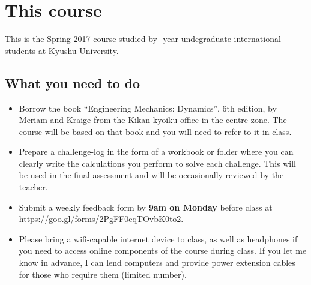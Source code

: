 \section{This course}
This is the Spring 2017 \course course studied by \nensei-year undegraduate international students at Kyushu University.

\subsection{What you need to do}
\begin{itemize}
    \item Borrow the book ``Engineering Mechanics: Dynamics'', 6th edition, by Meriam and Kraige from the Kikan-kyoiku office in the centre-zone. The course will be based on that book and you will need to refer to it in class.
    \item Prepare a challenge-log in the form of a workbook or folder where you can clearly write the calculations you perform to solve each challenge. This will be used in the final assessment and will be occasionally reviewed by the teacher.
    \item Submit a weekly feedback form by \textbf{9am on Monday} before class at \url{https://goo.gl/forms/2PgFF0eqTOvbK0to2}.
    \item Please bring a wifi-capable internet device to class, as well as headphones if you need to access online components of the course during class. If you let me know in advance, I can lend computers and provide power extension cables for those who require them (limited number).
\end{itemize}

